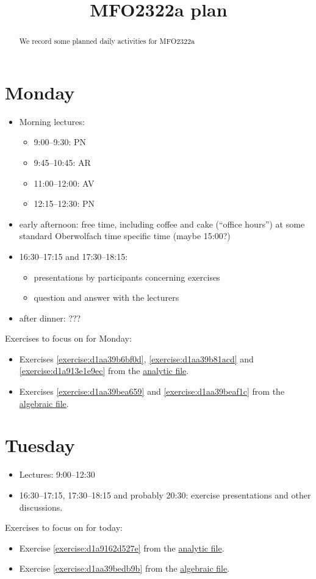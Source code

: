\documentclass[reqno]{amsart} 
\title{MFO2322a plan}
\begin{document}
\begin{abstract}
  We record some planned daily activities for MFO2322a
\end{abstract}

\section{Monday}
\begin{itemize}
\item Morning lectures:
  \begin{itemize}
  \item 9:00--9:30: PN
  \item 9:45--10:45: AR
  \item 11:00--12:00: AV
  \item 12:15--12:30: PN
  \end{itemize}
\item early afternoon: free time, including coffee and cake (``office hours'') at some standard Oberwolfach time specific time (maybe 15:00?)
\item 16:30--17:15 and 17:30--18:15:
  \begin{itemize}
  \item presentations by participants concerning exercises
  \item question and answer with the lecturers
  \end{itemize}
\item after dinner: ???
\end{itemize}

Exercises to focus on for Monday:
\begin{itemize}
\item Exercises \ref{exercise:d1aa39b6bf0d}, \ref{exercise:d1aa39b81acd} and \ref{exercise:d1a913e1e9ec} from the \href{20230524T094424__exercises-localized-vectors.pdf}{analytic file}.
\item Exercises \ref{exercise:d1aa39bea659} and \ref{exercise:d1aa39beaf1c} from the \href{20230528T213149__microlocal-algebraic-exercises.pdf}{algebraic file}.
\end{itemize}

\section{Tuesday}
\begin{itemize}
\item Lectures: 9:00--12:30
\item 16:30--17:15, 17:30--18:15 and probably 20:30: exercise presentations and other discussions.
\end{itemize}
Exercises to focus on for today:
\begin{itemize}
\item Exercise \ref{exercise:d1a9162d527e} from the \href{20230524T094424__exercises-localized-vectors.pdf}{analytic file}.
\item Exercise \ref{exercise:d1aa39bedb9b} from the \href{20230528T213149__microlocal-algebraic-exercises.pdf}{algebraic file}.
\end{itemize}

{} 
\end{document}
